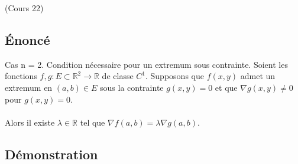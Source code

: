 \documentclass{article}
\begin{document}
(Cours 22)

\subsection{Énoncé}

Cas n = 2. Condition nécessaire pour un extremum sous contrainte. Soient les fonctions $ f, g : E \subset \mathbb{R}^2 \to \mathbb{R} $ de classe $ C^1 $. Supposons que $ f(x, y) $ admet un extremum en $ (a, b) \in E $ sous la contrainte $ g(x, y) = 0 $ et que $ \nabla g(x, y) \neq 0 $ pour $ g(x, y) = 0 $.\\\\
Alors il existe $ \lambda \in \mathbb{R} $ tel que $ \nabla f(a, b) = \lambda \nabla g(a, b) $.

\subsection{Démonstration}
\end{document}
